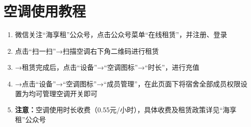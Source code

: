\section[空调使用教程]{空调使用教程}
\label{air_control}
\begin{enumerate}
      \item 微信关注“海享租”公众号，点击公众号菜单“在线租赁”，并注册、登录
      \item 点击“扫一扫”→扫描空调右下角二维码进行租赁\footnotemark
      \item →租赁完成后，点击“设备”→“空调图标”→“时长”，进行充值
      \item →点击“设备”→“空调图标”→“成员管理”，在此页面下将宿舍全部成员权限设置为均可管理空调开关即可
      \item \textbf{注意：}空调使用时长收费（0.55元/小时），具体收费及租赁政策详见“海享租”公众号
\end{enumerate}

